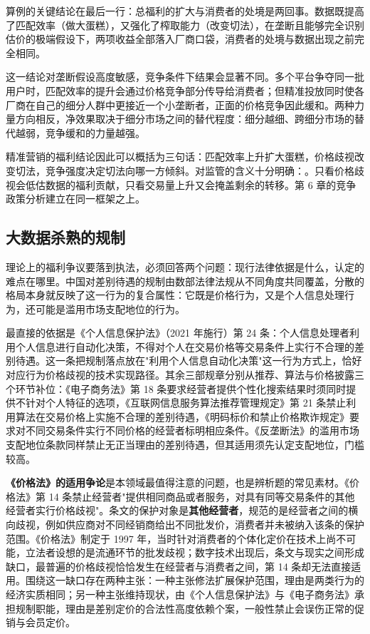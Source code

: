 算例的关键结论在最后一行：总福利的扩大与消费者的处境是两回事。数据既提高了匹配效率（做大蛋糕），又强化了榨取能力（改变切法），在垄断且能够完全识别估价的极端假设下，两项收益全部落入厂商口袋，消费者的处境与数据出现之前完全相同。

这一结论对垄断假设高度敏感，竞争条件下结果会显著不同。多个平台争夺同一批用户时，匹配效率的提升会通过价格竞争部分传导给消费者；但精准投放同时使各厂商在自己的细分人群中更接近一个小垄断者，正面的价格竞争因此缓和。两种力量方向相反，净效果取决于细分市场之间的替代程度：细分越细、跨细分市场的替代越弱，竞争缓和的力量越强。

精准营销的福利结论因此可以概括为三句话：匹配效率上升扩大蛋糕，价格歧视改变切法，竞争强度决定切法向哪一方倾斜。对监管的含义十分明确：。只看价格歧视会低估数据的福利贡献，只看交易量上升又会掩盖剩余的转移。第 6 章的竞争政策分析建立在同一框架之上。

\subsection{大数据杀熟的规制}

理论上的福利争议要落到执法，必须回答两个问题：现行法律依据是什么，认定的难点在哪里。中国对差别待遇的规制由数部法律法规从不同角度共同覆盖，分散的格局本身就反映了这一行为的复合属性：它既是价格行为，又是个人信息处理行为，还可能是滥用市场支配地位的行为。

最直接的依据是《个人信息保护法》（2021 年施行）第 24 条：个人信息处理者利用个人信息进行自动化决策，不得对个人在交易价格等交易条件上实行不合理的差别待遇。这一条把规制落点放在"利用个人信息自动化决策"这一行为方式上，恰好对应行为价格歧视的技术实现路径。其余三部规章分别从推荐、算法与价格披露三个环节补位：《电子商务法》第 18 条要求经营者提供个性化搜索结果时须同时提供不针对个人特征的选项，《互联网信息服务算法推荐管理规定》第 21 条禁止利用算法在交易价格上实施不合理的差别待遇，《明码标价和禁止价格欺诈规定》要求对不同交易条件实行不同价格的经营者标明相应条件。《反垄断法》的滥用市场支配地位条款同样禁止无正当理由的差别待遇，但其适用须先认定支配地位，门槛较高。

\textbf{《价格法》的适用争论}是本领域最值得注意的问题，也是辨析题的常见素材。《价格法》第 14 条禁止经营者"提供相同商品或者服务，对具有同等交易条件的其他经营者实行价格歧视"。条文的保护对象是\textbf{其他经营者}，规范的是经营者之间的横向歧视，例如供应商对不同经销商给出不同批发价，消费者并未被纳入该条的保护范围。《价格法》制定于 1997 年，当时针对消费者的个体化定价在技术上尚不可能，立法者设想的是流通环节的批发歧视；数字技术出现后，条文与现实之间形成缺口，最普遍的价格歧视恰恰发生在经营者与消费者之间，第 14 条却无法直接适用。围绕这一缺口存在两种主张：一种主张修法扩展保护范围，理由是两类行为的经济实质相同；另一种主张维持现状，由《个人信息保护法》与《电子商务法》承担规制职能，理由是差别定价的合法性高度依赖个案，一般性禁止会误伤正常的促销与会员定价。

